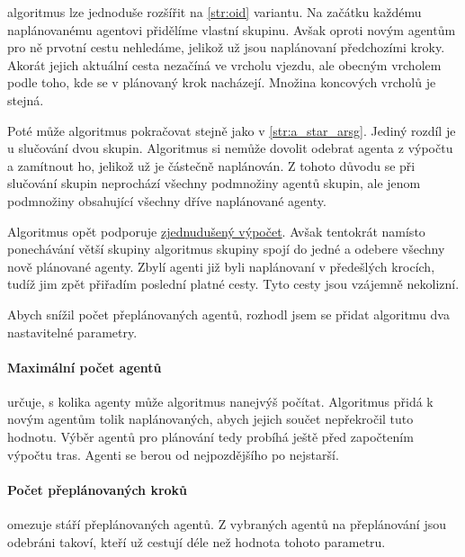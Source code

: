  algoritmus lze jednoduše rozšířit na \ref{str:oid} variantu.
Na začátku každému naplánovanému agentovi přidělíme vlastní skupinu.
Avšak oproti novým agentům pro ně prvotní cestu nehledáme, jelikož už jsou naplánovaní předchozími kroky.
Akorát jejich aktuální cesta nezačíná ve vrcholu vjezdu,
ale obecným vrcholem podle toho, kde se v plánovaný krok nacházejí.
Množina koncových vrcholů je stejná.

Poté může algoritmus pokračovat stejně jako v \ref{str:a_star_arsg}.
Jediný rozdíl je u slučování dvou skupin.
Algoritmus si nemůže dovolit odebrat agenta z výpočtu a zamítnout ho, jelikož už je částečně naplánován.
Z tohoto důvodu se při slučování skupin neprochází všechny podmnožiny agentů skupin,
ale jenom podmnožiny obsahující všechny dříve naplánované agenty.

Algoritmus opět podporuje \hyperref[par:arsg_zvp]{zjednudušený výpočet}.
Avšak tentokrát namísto ponechávání větší skupiny
algoritmus skupiny spojí do jedné a odebere všechny nově plánované agenty.
Zbylí agenti již byli naplánovaní v předešlých krocích, tudíž jim zpět přiřadím poslední platné cesty.
Tyto cesty jsou vzájemně nekolizní.

Abych snížil počet přeplánovaných agentů, rozhodl jsem se přidat algoritmu dva nastavitelné parametry.

\paragraph{Maximální počet agentů} určuje, s kolika agenty může algoritmus nanejvýš počítat.
Algoritmus přidá k novým agentům tolik naplánovaných, abych jejich součet nepřekročil tuto hodnotu.
Výběr agentů pro plánování tedy probíhá ještě před započtením výpočtu tras.
Agenti se berou od nejpozdějšího po nejstarší.

\paragraph{Počet přeplánovaných kroků} omezuje stáří přeplánovaných agentů.
Z vybraných agentů na přeplánování jsou odebráni takoví, kteří už cestují déle než hodnota tohoto parametru.
